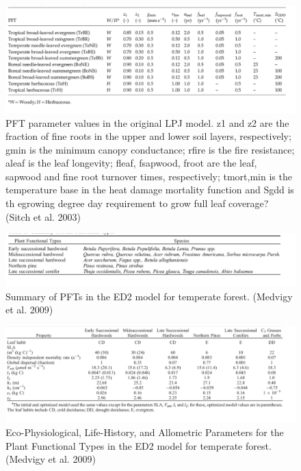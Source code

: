 \documentclass[
  12pt,
  oneside]{book}
\begin{document}
\begin{figure}

{\centering \includegraphics[width=0.8\linewidth]{figures/chap7/f714_LPJ_pft_table} 

}

\caption{PFT parameter values in the original LPJ model. z1 and z2 are the fraction of fine roots in the upper and lower soil layers, respectively; gmin is the minimum canopy conductance; rfire is the fire resistance; aleaf is the leaf longevity; fleaf, fsapwood, froot are the leaf, sapwood and fine root turnover times, respectively; tmort,min is the temperature base in the heat damage mortality function and Sgdd is th egrowing degree day requirement to grow full leaf coverage? (Sitch et al. 2003)}\label{fig:f714}
\end{figure}

\begin{figure}

{\centering \includegraphics[width=0.8\linewidth]{figures/chap7/f715_ed2_pft_table} 

}

\caption{Summary of PFTs in the ED2 model for temperate forest. (Medvigy  et al. 2009)}\label{fig:f715}
\end{figure}

\begin{figure}

{\centering \includegraphics[width=0.8\linewidth]{figures/chap7/f716_ED2_pft_values_table} 

}

\caption{Eco-Physiological, Life-History, and Allometric Parameters for the Plant Functional Types in the ED2 model for temperate forest. (Medvigy et al. 2009)}\label{fig:f716}
\end{figure}
\end{document}
